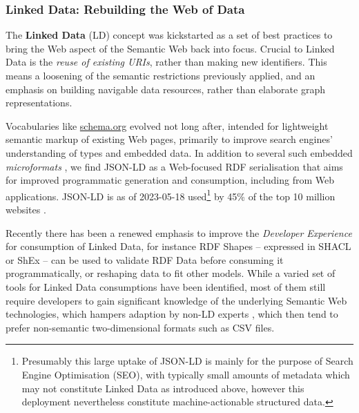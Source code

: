 \subsubsection{Linked Data: Rebuilding the Web of Data}\label{ch3:ld-web}

The \textbf{Linked Data} (LD) concept \cite{Bizer 2009} was kickstarted as a set of best practices \cite{LinkedDataDesign} to bring the Web aspect of the Semantic Web back into focus. Crucial to Linked Data is the \emph{reuse of existing URIs}, rather than making new identifiers. This means a loosening of the semantic restrictions previously applied, and an emphasis on building navigable data resources, rather than elaborate graph representations.

Vocabularies like \href{https://schema.org/}{schema.org} evolved not long after, intended for lightweight semantic markup of existing Web pages, primarily to improve search engines' understanding of types and embedded data. In addition to several such embedded \emph{microformats} \cite{OpenGraphProtocol,w3-rdfa-primer,HTMLStandard}, we find JSON-LD \cite{w3-json-ld} as a Web-focused RDF serialisation that aims for improved programmatic generation and consumption, including from Web applications. JSON-LD is as of 2023-05-18 used\footnote{Presumably this large uptake of JSON-LD is mainly for the purpose of Search Engine Optimisation (SEO), with typically small amounts of metadata which may not constitute Linked Data as introduced above, however this deployment nevertheless constitute machine-actionable structured data.} by 45\% of the top 10 million websites \cite{UsageStatisticsJSONLD}.

Recently there has been a renewed emphasis to improve the \emph{Developer Experience} \cite{DesigningLinkedData2018} for consumption of Linked Data, for instance RDF Shapes -- expressed in SHACL \cite{w3-shacl} or ShEx \cite{ShapeExpressionsShEx} -- can be used to validate RDF Data \cite{gayoValidatingRDFData2017a,thorntonUsingShapeExpressions2019a} before consuming it programmatically, or reshaping data to fit other models. While a varied set of tools for Linked Data consumptions have been identified, most of them still require developers to gain significant knowledge of the underlying Semantic Web technologies, which hampers adaption by non-LD experts \cite{klimekSurveyToolsLinked2019a}, which then tend to prefer non-semantic two-dimensional formats such as CSV files.

